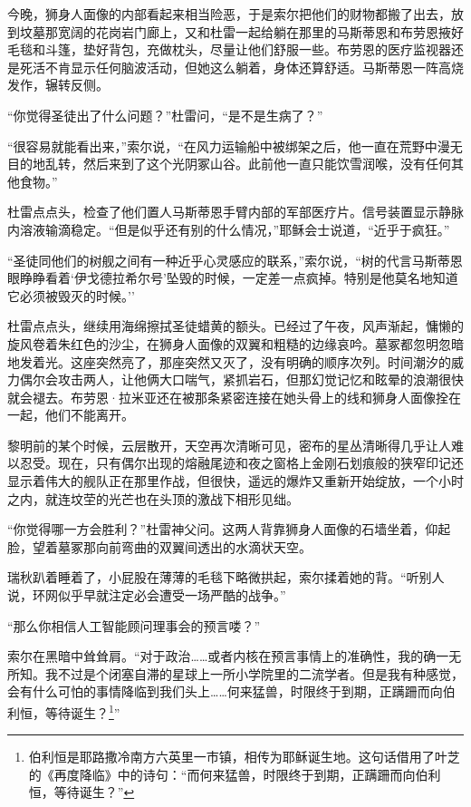 \documentclass[AutoFakeBold=true]{book}
\begin{document}
今晚，狮身人面像的内部看起来相当险恶，于是索尔把他们的财物都搬了出去，放到坟墓那宽阔的花岗岩门廊上，又和杜雷一起给躺在那里的马斯蒂恩和布劳恩掖好毛毯和斗篷，垫好背包，充做枕头，尽量让他们舒服一些。布劳恩的医疗监视器还是死活不肯显示任何脑波活动，但她这么躺着，身体还算舒适。马斯蒂恩一阵高烧发作，辗转反侧。

``你觉得圣徒出了什么问题？''杜雷问，``是不是生病了？''

``很容易就能看出来，''索尔说，``在风力运输船中被绑架之后，他一直在荒野中漫无目的地乱转，然后来到了这个光阴冢山谷。此前他一直只能饮雪润喉，没有任何其他食物。''

杜雷点点头，检查了他们置人马斯蒂恩手臂内部的军部医疗片。信号装置显示静脉内溶液输滴稳定。``但是似乎还有别的什么情况，''耶稣会士说道，``近乎于疯狂。''

``圣徒同他们的树舰之间有一种近乎心灵感应的联系，''索尔说，``树的代言马斯蒂恩眼睁睁看着`伊戈德拉希尔号'坠毁的时候，一定差一点疯掉。特别是他莫名地知道它必须被毁灭的时候。''

杜雷点点头，继续用海绵擦拭圣徒蜡黄的额头。已经过了午夜，风声渐起，慵懒的旋风卷着朱红色的沙尘，在狮身人面像的双翼和粗糙的边缘哀吟。墓冢都忽明忽暗地发着光。这座突然亮了，那座突然又灭了，没有明确的顺序次列。时间潮汐的威力偶尔会攻击两人，让他俩大口喘气，紧抓岩石，但那{\kaishu 幻觉记忆}和眩晕的浪潮很快就会褪去。布劳恩·拉米亚还在被那条紧密连接在她头骨上的线和狮身人面像拴在一起，他们不能离开。

黎明前的某个时候，云层散开，天空再次清晰可见，密布的星丛清晰得几乎让人难以忍受。现在，只有偶尔出现的熔融尾迹和夜之窗格上金刚石划痕般的狭窄印记还显示着伟大的舰队正在那里作战，但很快，遥远的爆炸又重新开始绽放，一个小时之内，就连坟茔的光芒也在头顶的激战下相形见绌。

``你觉得哪一方会胜利？''杜雷神父问。这两人背靠狮身人面像的石墙坐着，仰起脸，望着墓冢那向前弯曲的双翼间透出的水滴状天空。

瑞秋趴着睡着了，小屁股在薄薄的毛毯下略微拱起，索尔揉着她的背。``听别人说，环网似乎早就注定必会遭受一场严酷的战争。''

``那么你相信人工智能顾问理事会的预言喽？''

索尔在黑暗中耸耸肩。``对于政治……或者内核在预言事情上的准确性，我的确一无所知。我不过是个闭塞自滞的星球上一所小学院里的二流学者。但是我有种{\kaishu 感觉}，会有什么可怕的事情降临到我们头上……何来猛兽，时限终于到期，正蹒跚而向伯利恒，等待诞生？\footnote{伯利恒是耶路撒冷南方六英里一市镇，相传为耶稣诞生地。这句话借用了叶芝的《再度降临》中的诗句：``而何来猛兽，时限终于到期，正蹒跚而向伯利恒，等待诞生？''}''
\end{document}
